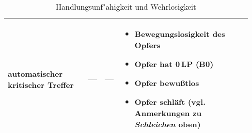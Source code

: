 \documentclass[10pt,a4paper,germanpar]{article}
\renewcommand{\arraystretch}{1.5}
\begin{document}
\begin{table}[htbp]
{\begin{center}
\begin{tabu}{|p{2.4cm}||p{4.3cm}|p{4.1cm}|p{4.5cm}|}
      \hline
      automatischer kritischer Treffer\footnotemark&
      ---&
      ---&
      \begin{itemize}
      \item Bewegungslosigkeit des Opfers
      \item Opfer hat 0\,LP (B0)
      \item Opfer bewußtlos
      \item Opfer schläft (vgl. Anmerkungen zu \emph{Schleichen} oben)
      \end{itemize} \\
      \hline
    \end{tabu}
    \renewcommand{\arraystretch}{1.5}
    \caption{Handlungsunf"ahigkeit und Wehrlosigkeit}
    \label{tab:handlung}
  \end{center}
}
\end{table}

\end{document}
